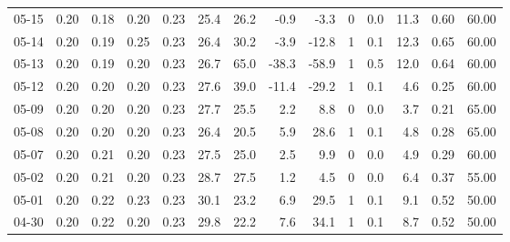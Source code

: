 \begin{threeparttable}
{\begin{tabular}{lrrrrrrrrrrrrr}
  05-15 &          0.20 &          0.18 &          0.20 &        0.23 &                25.4 &                26.2 &       -0.9 &         -3.3 &              0 &                 0.0 &             11.3 &            0.60 &                  60.00 \\
  05-14 &          0.20 &          0.19 &          0.25 &        0.23 &                26.4 &                30.2 &       -3.9 &        -12.8 &              1 &                 0.1 &             12.3 &            0.65 &                  60.00 \\
  05-13 &          0.20 &          0.19 &          0.20 &        0.23 &                26.7 &                65.0 &      -38.3 &        -58.9 &              1 &                 0.5 &             12.0 &            0.64 &                  60.00 \\
  05-12 &          0.20 &          0.20 &          0.20 &        0.23 &                27.6 &                39.0 &      -11.4 &        -29.2 &              1 &                 0.1 &              4.6 &            0.25 &                  60.00 \\
  05-09 &          0.20 &          0.20 &          0.20 &        0.23 &                27.7 &                25.5 &        2.2 &          8.8 &              0 &                 0.0 &              3.7 &            0.21 &                  65.00 \\
  05-08 &          0.20 &          0.20 &          0.20 &        0.23 &                26.4 &                20.5 &        5.9 &         28.6 &              1 &                 0.1 &              4.8 &            0.28 &                  65.00 \\
  05-07 &          0.20 &          0.21 &          0.20 &        0.23 &                27.5 &                25.0 &        2.5 &          9.9 &              0 &                 0.0 &              4.9 &            0.29 &                  60.00 \\
  05-02 &          0.20 &          0.21 &          0.20 &        0.23 &                28.7 &                27.5 &        1.2 &          4.5 &              0 &                 0.0 &              6.4 &            0.37 &                  55.00 \\
  05-01 &          0.20 &          0.22 &          0.23 &        0.23 &                30.1 &                23.2 &        6.9 &         29.5 &              1 &                 0.1 &              9.1 &            0.52 &                  50.00 \\
  04-30 &          0.20 &          0.22 &          0.20 &        0.23 &                29.8 &                22.2 &        7.6 &         34.1 &              1 &                 0.1 &              8.7 &            0.52 &                  50.00 \\

\end{tabular}}
\end{threeparttable}

